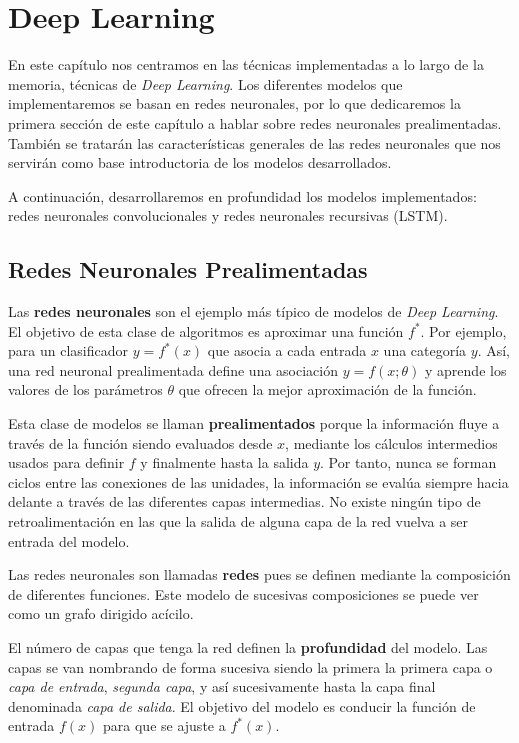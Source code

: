 \chapter{Deep Learning}

	En este capítulo nos centramos en las técnicas implementadas a lo largo de la memoria, técnicas de \textit{Deep Learning}. Los diferentes modelos que implementaremos se basan en redes neuronales, por lo que dedicaremos la primera sección de este capítulo a hablar sobre redes neuronales prealimentadas. También se tratarán las características generales de las redes neuronales que nos servirán como base introductoria de los modelos desarrollados.
	
	A continuación, desarrollaremos en profundidad los modelos implementados: redes neuronales convolucionales y redes neuronales recursivas (LSTM). 
	

\section{Redes Neuronales Prealimentadas}

Las \textbf{redes neuronales} son el ejemplo más típico de modelos de \textit{Deep Learning}. El objetivo de esta clase de algoritmos es aproximar una función $f^*$. Por ejemplo, para un clasificador $y = f^*(x)$ que asocia a cada entrada $x$ una categoría $y$. Así, una red neuronal prealimentada define una asociación $y = f(x; \theta)$ y aprende los valores de los parámetros $\theta$ que ofrecen la mejor aproximación de la función.

Esta clase de modelos se llaman \textbf{prealimentados} porque la información fluye a través de la función siendo evaluados desde $x$, mediante los cálculos intermedios usados para definir $f$ y finalmente hasta la salida $y$. Por tanto, nunca se forman ciclos entre las conexiones de las unidades, la información se evalúa siempre hacia delante a través de las diferentes capas intermedias. No existe ningún tipo de retroalimentación en las que la salida de alguna capa de la red vuelva a ser entrada del modelo. 

Las redes neuronales son llamadas \textbf{redes} pues se definen mediante la composición de diferentes funciones. Este modelo de sucesivas composiciones se puede ver como un grafo dirigido acícilo.  

El número de capas que tenga la red definen la \textbf{profundidad} del modelo. Las capas se van nombrando de forma sucesiva siendo la primera la primera capa o \textit{capa de entrada}, \textit{segunda capa}, y así sucesivamente hasta la capa final denominada \textit{capa de salida}. El objetivo del modelo es conducir la función de entrada $f(x)$ para que se ajuste a $f^*(x)$. 

